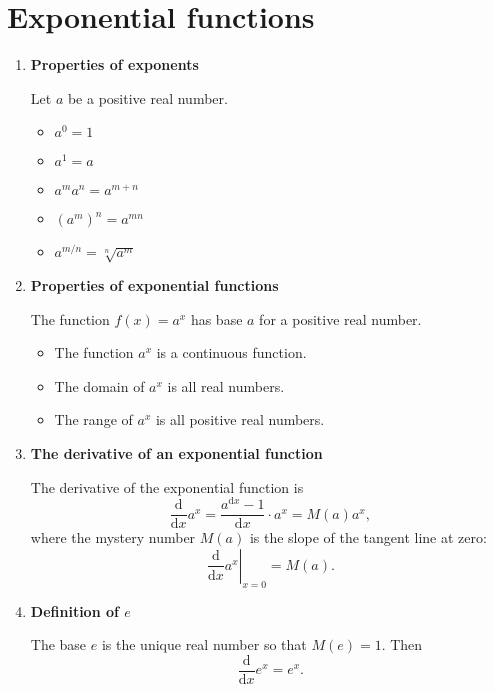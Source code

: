 \section{Exponential functions}
\begin{enumerate}
    \item \textbf{Properties of exponents}

        Let $a$ be a positive real number.
        \begin{itemize}
            \item $a^0=1$
            \item $a^1=a$
            \item $a^m a^n=a^{m+n}$
            \item $(a^m)^n=a^{mn}$
            \item $a^{m/n}=\sqrt[n]{a^m}$
        \end{itemize}
    \item \textbf{Properties of exponential functions}

        The function $f(x)=a^x$ has base $a$ for a positive real number.
        \begin{itemize}
            \item The function $a^x$ is a continuous function.
            \item The domain of $a^x$ is all real numbers.
            \item The range of $a^x$ is all positive real numbers.
        \end{itemize}
    \item \textbf{The derivative of an exponential function}

        The derivative of the exponential function is
        $$
        \frac{\mathrm{d}}{\mathrm{d}x}a^x=\frac{a^{\mathrm{d}x}-1}{\mathrm{d}x}\cdot a^x=M(a)a^x,
        $$
        where the mystery number $M(a)$ is the slope of the tangent line at zero:
        $$
        \left.\frac{\mathrm{d}}{\mathrm{d}x}a^x\right|_{x=0}=M(a).
        $$
    \item \textbf{Definition of $e$}
        
        The base $e$ is the unique real number so that $M(e)=1$. Then
        $$
        \frac{\mathrm{d}}{\mathrm{d}x}e^x=e^x.
        $$
\end{enumerate}

